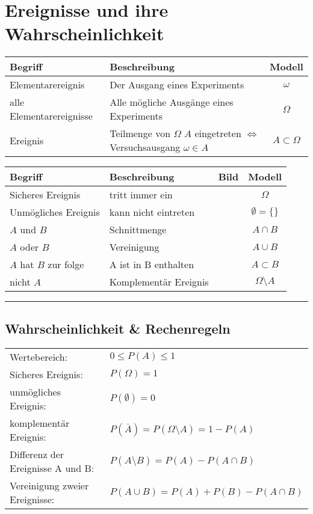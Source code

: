 \newpage
\section{Ereignisse und ihre Wahrscheinlichkeit}

	\begin{tabular}{|l|l|c|}
		\hline
		Begriff & Beschreibung & Modell\\
		\hline
		Elementarereignis & Der Ausgang eines Experiments & $\omega$\\
		alle Elementarereignisse & Alle mögliche Ausgänge eines Experiments & $\Omega$ \\
		Ereignis & Teilmenge von $\Omega$ \quad $A$ eingetreten $\Leftrightarrow$ Versuchsausgang $\omega \in A$ \ & $A \subset \Omega$\\
		\hline
	\end{tabular}
	
	\vspace{0.2cm}
	
	\begin{tabular}{|l|l|c|c|}
		\hline
		Begriff & Beschreibung & Bild & Modell\\
		\hline
		Sicheres Ereignis & tritt immer ein &  & $\Omega$\\
		\hline
		Unmögliches Ereignis & kann nicht eintreten &  & $\emptyset = \{\}$\\
		\hline
		$A$ und $B$ & Schnittmenge &  & $A \cap B$\\
		\hline
		$A$ oder $B$ & Vereinigung &  & $A \cup B$\\
		\hline
		$A$ hat $B$ zur folge & A ist in B enthalten &  & $A \subset B$ \\
		\hline
		nicht $A$ & Komplementär Ereignis &  & $\Omega\setminus A$\\
		\hline
	\end{tabular}
\vspace{.2cm}
\hrule

\subsection{Wahrscheinlichkeit \& Rechenregeln}
	\begin{tabular}{l:l}
	  Wertebereich: & ${0}\le{P(A)}\le{1}$\\ \hdashline
	  Sicheres Ereignis:    & $P(\Omega)=1$\\ \hdashline
	  unmögliches Ereignis: & $P(\emptyset)=0$\\ \hdashline
	  komplementär Ereignis: & $P(\bar{A})=P({\Omega}\setminus{A})=1-P(A)$\\ \hdashline
	  Differenz der Ereignisse A und B: & $P({A}\setminus{B})=P(A)-P({A}\cap{B})$\\ \hdashline
	  Vereinigung zweier Ereignisse: & $P({A}\cup{B})=P(A)+P(B)-P({A}\cap{B})$\\
	\end{tabular}
	
